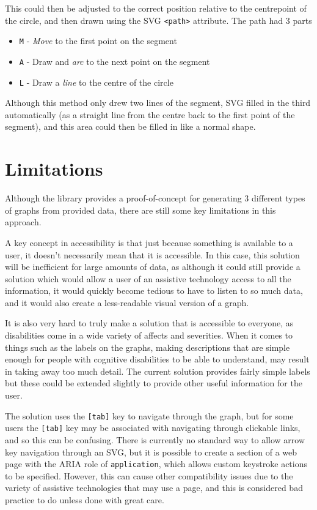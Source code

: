 \documentclass[ %
                    author={Aleena Baig},
                supervisor={Dr Simon Lock},
                    degree={BSc},
                     title={On Making Web Accessible Graphs},
                  subtitle={},
                      year={2019} ]{dissertation}
\begin{document}
This could then be adjusted to the correct position relative to the centrepoint of the circle, and then drawn using the SVG \texttt{<path>} attribute. The path had 3 parts

\begin{itemize}
    \item \texttt{M} - \textit{Move} to the first point on the segment
    \item \texttt{A} - Draw and \textit{arc} to the next point on the segment
    \item \texttt{L} - Draw a \textit{line} to the centre of the circle
\end{itemize}

Although this method only drew two lines of the segment, SVG filled in the third automatically (as a straight line from the centre back to the first point of the segment), and this area could then be filled in like a normal shape.


\section{Limitations}

Although the library provides a proof-of-concept for generating 3 different types of graphs from provided data, there are still some key limitations in this approach.

A key concept in accessibility is that just because something is available to a user, it doesn't necessarily mean that it is accessible. In this case, this solution will be inefficient for large amounts of data, as although it could still provide a solution which would allow a user of an assistive technology access to all the information, it would quickly become tedious to have to listen to so much data, and it would also create a less-readable visual version of a graph.

It is also very hard to truly make a solution that is accessible to everyone, as disabilities come in a wide variety of affects and severities. When it comes to things such as the labels on the graphs, making descriptions that are simple enough for people with cognitive disabilities to be able to understand, may result in taking away too much detail. The current solution provides fairly simple labels but these could be extended slightly to provide other useful information for the user.

The solution uses the \texttt{[tab]} key to navigate through the graph, but for some users the \texttt{[tab]} key may be associated with navigating through clickable links, and so this can be confusing. There is currently no standard way to allow arrow key navigation through an SVG, but it is possible to create a section of a web page with the ARIA role of \texttt{application}, which allows custom keystroke actions to be specified. However, this can cause other compatibility issues due to the variety of assistive technologies that may use a page, and this is considered bad practice to do unless done with great care.
\end{document}
